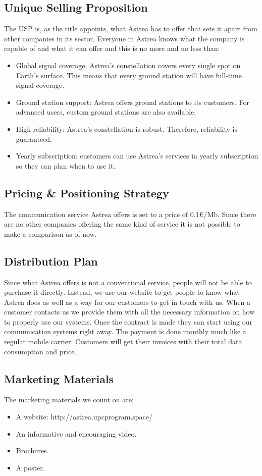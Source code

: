 \subsection{Unique Selling Proposition}
The USP is, as the title appoints, what Astrea has to offer that sets it apart from other companies in its sector. Everyone in Astrea knows what the company is capable of and what it can offer and this is no more and no less than:
\begin{itemize}
\item Global signal coverage: Astrea's constellation covers every single spot on Earth's surface. This means that every ground station will have full-time signal coverage.
\item Ground station support: Astrea offers ground stations to its customers. For advanced users, custom ground stations are also available.
\item High reliability: Astrea's constellation is robust. Therefore, reliability is guaranteed.
\item Yearly subscription: customers can use Astrea's services in yearly subscription so they can plan when to use it.
\end{itemize}
\subsection{Pricing \& Positioning Strategy}
The communication service Astrea offers is set to a price of 0.1\euro /Mb. Since there are no other companies offering the same kind of service it is not possible to make a comparison as of now. 

\subsection{Distribution Plan}
Since what Astrea offers is not a conventional service, people will not be able to purchase it directly. Instead, we use our website to get people to know what Astrea does as well as a way for our customers to get in touch with us. When a customer contacts us we provide them with all the necessary information on how to properly use our systems. Once the contract is made they can start using our communication systems right away. The payment is done monthly much like a regular mobile carrier. Customers will get their invoices with their total data consumption and price.

\subsection{Marketing Materials}
The marketing materials we count on are:
\begin{itemize}
\item A website: http://astrea.upcprogram.space/
\item An informative and encouraging video.
\item Brochures.
\item A poster.
\end{itemize}

